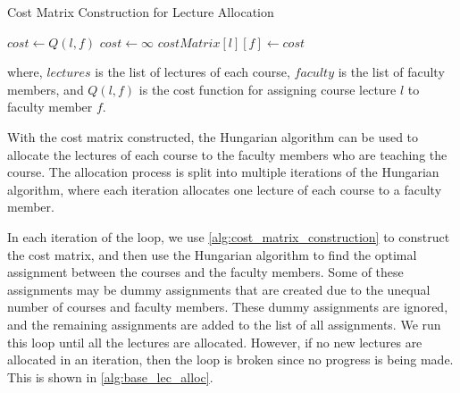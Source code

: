 \begin{algorithm}[H]
  \caption{Cost Matrix Construction for Lecture Allocation}
  \begin{algorithmic}[1]
    \State $cost \gets Q(l, f)$
    \Else
    \State $cost \gets \infty$
    \EndIf
    \State $costMatrix[l][f] \gets cost$
    \EndFor
    \EndFor
    \EndProcedure
  \end{algorithmic}
  \label{alg:cost_matrix_construction}
\end{algorithm}

where, \(lectures\) is the list of lectures of each course, \(faculty\) is the list of faculty members, and \(Q(l, f)\) is the cost function for assigning course lecture \(l\) to faculty member \(f\).

With the cost matrix constructed, the Hungarian algorithm can be used to allocate the lectures of each course to the faculty members who are teaching the course. The allocation process is split into multiple iterations of the Hungarian algorithm, where each iteration allocates one lecture of each course to a faculty member.

In each iteration of the loop, we use \autoref{alg:cost_matrix_construction} to construct the cost matrix, and then use the Hungarian algorithm to find the optimal assignment between the courses and the faculty members. Some of these assignments may be dummy assignments that are created due to the unequal number of courses and faculty members. These dummy assignments are ignored, and the remaining assignments are added to the list of all assignments. We run this loop until all the lectures are allocated. However, if no new lectures are allocated in an iteration, then the loop is broken since no progress is being made. This is shown in \autoref{alg:base_lec_alloc}.

